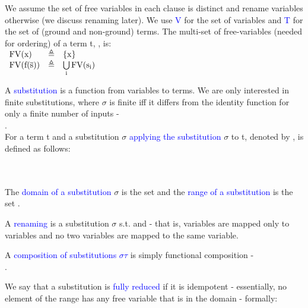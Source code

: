 We assume the set of free variables in each clause is distinct and rename variables otherwise (we discuss renaming later). 
We use \textcolor{blue}{V} for the set of variables and \textcolor{blue}{T} for the set of (ground and non-ground) terms.
The multi-set of free-variables (needed for ordering) of a term t, , is:\\
$ 
\begin{array}{lll}
	\mathrm{FV}(\mathrm{x})         & \triangleq & \left\{\mathrm{x}\right\}\\
	\mathrm{FV}(\mathrm{\mathrm{f}(\mathrm{\overline{s}})}) & \triangleq & \bigcup\limits_{\mathrm{i}} \mathrm{FV}(\mathrm{s_i})\\
\end{array} 
$

\bigskip
\noindent
A \textcolor{blue}{substitution}  is a function from variables to terms. 
We are only interested in finite substitutions, where $\sigma$ is finite iff it differs from the identity function for only a finite number of inputs - \\ .\\
For a term t and a substitution $\sigma$ \textcolor{blue}{applying the substitution} $\sigma$ to t, denoted by , is defined as follows:\\
\\
\\

\bigskip
\noindent
The \textcolor{blue}{domain of a substitution} $\sigma$ is the set   and the \textcolor{blue}{range of a substitution} is the set .


\noindent
A \textcolor{blue}{renaming} is a substitution $\sigma$ s.t.  and  - that is, variables are mapped only to variables and no two variables are mapped to the same variable.

\noindent
A \textcolor{blue}{composition of substitutions $\sigma\tau$} is simply functional composition -\\
 .

\noindent
We say that a substitution is \textcolor{blue}{fully reduced} if it is idempotent - essentially, no element of the range has any free variable that is in the domain - formally:\\


